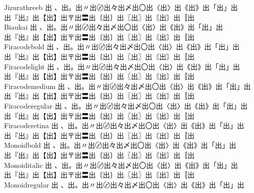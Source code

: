 \begin{tabbing}
Jizurathreeb \> {\mktsFontfileJizurathreeb{}出 、出。出〃出〄出々出〆出〇出〈出〉出《出》出「出」出}\\
\> {\mktsFontfileJizurathreeb{}出『出』出【出】出〒出〓出〔出〕出〖出〗出〘出〙出〚出} \\
Biaukai \> {\mktsFontfileBiaukai{}出 、出。出〃出〄出々出〆出〇出〈出〉出《出》出「出」出}\\
\> {\mktsFontfileBiaukai{}出『出』出【出】出〒出〓出〔出〕出〖出〗出〘出〙出〚出} \\
Firacodebold \> {\mktsFontfileFiracodebold{}出 、出。出〃出〄出々出〆出〇出〈出〉出《出》出「出」出}\\
\> {\mktsFontfileFiracodebold{}出『出』出【出】出〒出〓出〔出〕出〖出〗出〘出〙出〚出} \\
Firacodelight \> {\mktsFontfileFiracodelight{}出 、出。出〃出〄出々出〆出〇出〈出〉出《出》出「出」出}\\
\> {\mktsFontfileFiracodelight{}出『出』出【出】出〒出〓出〔出〕出〖出〗出〘出〙出〚出} \\
Firacodemedium \> {\mktsFontfileFiracodemedium{}出 、出。出〃出〄出々出〆出〇出〈出〉出《出》出「出」出}\\
\> {\mktsFontfileFiracodemedium{}出『出』出【出】出〒出〓出〔出〕出〖出〗出〘出〙出〚出} \\
Firacoderegular \> {\mktsFontfileFiracoderegular{}出 、出。出〃出〄出々出〆出〇出〈出〉出《出》出「出」出}\\
\> {\mktsFontfileFiracoderegular{}出『出』出【出】出〒出〓出〔出〕出〖出〗出〘出〙出〚出} \\
Firacoderetina \> {\mktsFontfileFiracoderetina{}出 、出。出〃出〄出々出〆出〇出〈出〉出《出》出「出」出}\\
\> {\mktsFontfileFiracoderetina{}出『出』出【出】出〒出〓出〔出〕出〖出〗出〘出〙出〚出} \\
Monoidbold \> {\mktsFontfileMonoidbold{}出 、出。出〃出〄出々出〆出〇出〈出〉出《出》出「出」出}\\
\> {\mktsFontfileMonoidbold{}出『出』出【出】出〒出〓出〔出〕出〖出〗出〘出〙出〚出} \\
Monoiditalic \> {\mktsFontfileMonoiditalic{}出 、出。出〃出〄出々出〆出〇出〈出〉出《出》出「出」出}\\
\> {\mktsFontfileMonoiditalic{}出『出』出【出】出〒出〓出〔出〕出〖出〗出〘出〙出〚出} \\
Monoidregular \> {\mktsFontfileMonoidregular{}出 、出。出〃出〄出々出〆出〇出〈出〉出《出》出「出」出}\\

\end{tabbing}
